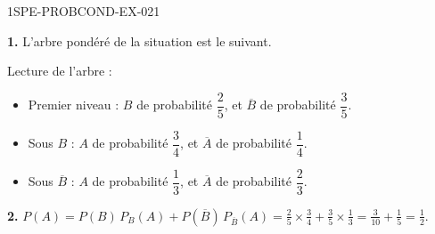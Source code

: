 \begin{corrige}{1SPE-PROBCOND-EX-021}

\textbf{1.} L'arbre pondéré de la situation est le suivant.

\begin{nxarbreproba}
\end{nxarbreproba}

Lecture de l'arbre :

\begin{itemize}
  \item Premier niveau : $B$ de probabilité $\dfrac{2}{5}$, et $\overline{B}$ de probabilité $\dfrac{3}{5}$.
  \item Sous $B$ : $A$ de probabilité $\dfrac{3}{4}$, et $\overline{A}$ de probabilité $\dfrac{1}{4}$.
  \item Sous $\overline{B}$ : $A$ de probabilité $\dfrac{1}{3}$, et $\overline{A}$ de probabilité $\dfrac{2}{3}$.
\end{itemize}

\medskip

\textbf{2.} $P(A) = P(B)\,P_B(A) + P(\overline{B})\,P_{\overline{B}}(A) = \frac{2}{5}\times\frac{3}{4} + \frac{3}{5}\times\frac{1}{3} = \frac{3}{10} + \frac{1}{5} = \frac{1}{2}$.

\end{corrige}
